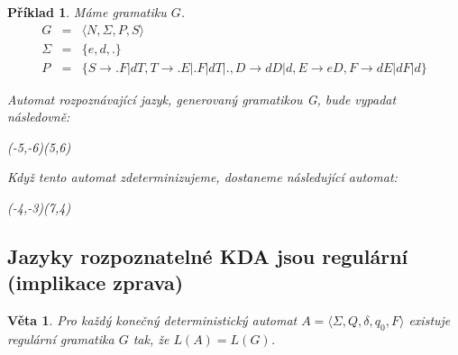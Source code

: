 \documentclass[10pt, a4paper, titlepage]{article}
\theoremstyle{note}
\newtheorem{veta}{Věta}
\newtheorem{priklad}{Příklad}
\begin{document}
\begin{priklad}
Máme gramatiku $G$.
\begin{eqnarray*}
G &=& \langle N,\Sigma,P,S \rangle \\
\Sigma &=& \lbrace e,d,. \rbrace \\
P &=& \lbrace S \rightarrow .F | dT , T \rightarrow .E|.F|dT|. , D \rightarrow dD|d , E \rightarrow eD , F \rightarrow dE|dF|d \rbrace
\end{eqnarray*}

Automat rozpoznávající jazyk, generovaný gramatikou G, bude vypadat následovně:

\begin{center}
\begin{VCPicture}{(-5,-6)(5,6)}
\end{VCPicture}
\end{center}

Když tento automat zdeterminizujeme, dostaneme následující automat:

\begin{center}
\begin{VCPicture}{(-4,-3)(7,4)}
\end{VCPicture}
\end{center}

\end{priklad}

\subsection{Jazyky rozpoznatelné KDA jsou regulární (implikace zprava)}

\begin{veta} 
Pro každý konečný deterministický automat $A = \langle \Sigma,Q,\delta,q_0,F \rangle$ existuje regulární gramatika $G$ tak, že $L(A)=L(G)$.
\end{veta}
\end{document}
